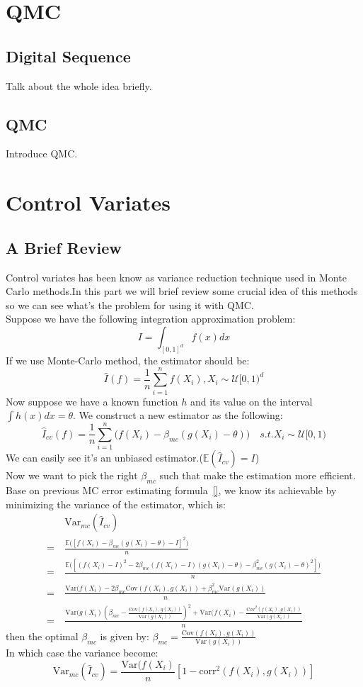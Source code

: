 
\section{QMC}

\subsection{Digital Sequence}
Talk about the whole idea briefly.
\subsection{QMC}
Introduce QMC.


\section{Control Variates}

\subsection{A Brief Review}
Control variates has been know as variance reduction technique used in Monte Carlo methods.In this part we will brief review some crucial idea of this methods so we can see what's the problem for using it with QMC. \\ 
Suppose we have the following integration approximation problem:
\[I= \int_{[0,1]^d}f(x)dx\]
If we use Monte-Carlo method, the estimator should be: 
\[
\hat{I}(f)=\frac{1}{n}\sum_{i=1}^{n}f(X_i), X_i\sim \mathcal{U}[0,1)^d
\]
Now suppose we have a known function $h$ and its value on the interval
$\int h(x)dx = \theta$.
We construct a new estimator as the following: 
\[ \hat{I}_{cv}(f)=\frac{1}{n}\sum_{i=1}^{n}\Big( f(X_i)-\beta_{mc}(g(X_i)-\theta) \Big) \quad s.t. X_i\sim \mathcal{U}[0,1)\]
We can easily see it's an unbiased estimator.($\mathbb{E}(\hat{I}_{cv}) = I$)\\
Now we want to pick the right $\beta_{mc}$ such that make the estimation more efficient. Base on previous MC error estimating formula~\eqref{}, we know its achievable by minimizing the variance of the estimator, which is: 
\begin{align*}
	\quad &\mathrm{Var}_{mc}(\hat{I}_{cv}) \\
	=& \frac{\mathbb{E}\big([f(X_i)-\beta_{mc}(g(X_i)-\theta)-I]^2 \big)}{n} \\
	=& \frac{\mathbb{E}\big([(f(X_i)-I)^2-2\beta_{mc}(f(X_i)-I)(g(X_i)-\theta)-\beta_{mc}^2(g(X_i)-\theta)^2] \big)}{n}\\
	=& \frac{\mathrm{Var}(f(X_i)-2\beta_{mc}\mathrm{Cov}(f(X_i),g(X_i))+\beta_{mc}^2\mathrm{Var}(g(X_i)) }{n}\\
	=& \frac{\mathrm{Var}(g(X_i)(\beta_{mc}-\frac{\mathrm{Cov}(f(X_i),g(X_i))}{\mathrm{Var}(g(X_i))})^2+\mathrm{Var}(f(X_i)-\frac{\mathrm{Cov}^2(f(X_i),g(X_i))}{\mathrm{Var}(g(X_i))} }{n}
\end{align*}
then the optimal $\beta_{mc}$ is given by: 
$\beta_{mc}=\frac{\mathrm{Cov}(f(X_i),g(X_i))}{\mathrm{Var}(g(X_i))}$\\
In which case the variance become:
\[
\mathrm{Var}_{mc}(\hat{I}_{cv})= \frac{\mathrm{Var}(f(X_i)}{n}[1-\mathrm{corr}^2(f(X_i), g(X_i))]
\]


